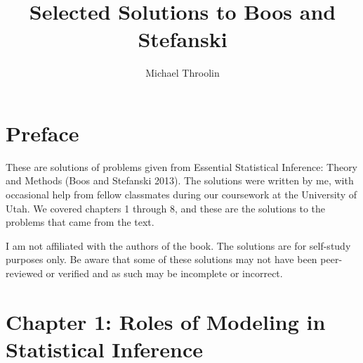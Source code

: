\documentclass[
  letterpaper,
  DIV=11,
  numbers=noendperiod]{scrreprt}
\title{Selected Solutions to Boos and Stefanski}
\author{Michael Throolin}
\date{}
\renewcommand*\contentsname{Table of contents}
\newcommand\contentsname{Table of contents}
\begin{document}
\maketitle
\ifdefined\Shaded\renewenvironment{Shaded}{\begin{tcolorbox}[borderline west={3pt}{0pt}{shadecolor}, breakable, frame hidden, boxrule=0pt, interior hidden, enhanced, sharp corners]}{\end{tcolorbox}}\fi

\renewcommand*\contentsname{Table of contents}
{
\hypersetup{linkcolor=}
\setcounter{tocdepth}{2}
\tableofcontents
}

\hypertarget{preface}{%
\chapter*{Preface}\label{preface}}


These are solutions of problems given from Essential Statistical
Inference: Theory and Methods (Boos and Stefanski 2013). The solutions
were written by me, with occasional help from fellow classmates during
our coursework at the University of Utah. We covered chapters 1 through
8, and these are the solutions to the problems that came from the text.

I am not affiliated with the authors of the book. The solutions are for
self-study purposes only. Be aware that some of these solutions may not
have been peer-reviewed or verified and as such may be incomplete or
incorrect.


\hypertarget{chapter-1-roles-of-modeling-in-statistical-inference}{%
\chapter{Chapter 1: Roles of Modeling in Statistical
Inference}\label{chapter-1-roles-of-modeling-in-statistical-inference}}
\end{document}
